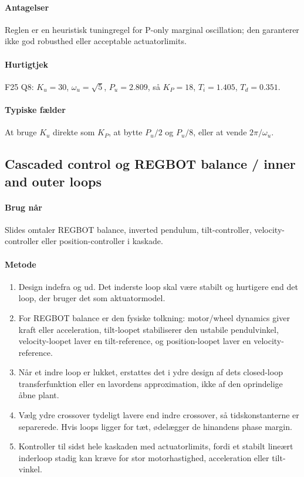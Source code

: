 \paragraph{Antagelser}
Reglen er en heuristisk tuningregel for P-only marginal oscillation; den garanterer ikke
god robusthed eller acceptable actuatorlimits.

\paragraph{Hurtigtjek}
F25 Q8: \(K_u=30\), \(\omega_u=\sqrt5\), \(P_u=2.809\), så \(K_P=18\),
\(T_i=1.405\), \(T_d=0.351\).

\paragraph{Typiske fælder}
At bruge \(K_u\) direkte som \(K_P\), at bytte \(P_u/2\) og \(P_u/8\), eller at vende
\(2\pi/\omega_u\).

\subsection{Cascaded control og REGBOT balance / inner and outer loops}
\label{sec:cascade-regbot}

\paragraph{Brug når}
Slides omtaler REGBOT balance, inverted pendulum, tilt-controller, velocity-controller
eller position-controller i kaskade.

\paragraph{Metode}
\begin{enumerate}
\item Design indefra og ud. Det inderste loop skal være stabilt og hurtigere end det
      loop, der bruger det som aktuatormodel.
\item For REGBOT balance er den fysiske tolkning: motor/wheel dynamics giver kraft eller
      acceleration, tilt-loopet stabiliserer den ustabile pendulvinkel, velocity-loopet
      laver en tilt-reference, og position-loopet laver en velocity-reference.
\item Når et indre loop er lukket, erstattes det i ydre design af dets closed-loop
      transferfunktion eller en lavordens approximation, ikke af den oprindelige åbne
      plant.
\item Vælg ydre crossover tydeligt lavere end indre crossover, så tidskonstanterne er
      separerede. Hvis loops ligger for tæt, ødelægger de hinandens phase margin.
\item Kontroller til sidst hele kaskaden med actuatorlimits, fordi et stabilt lineært
      inderloop stadig kan kræve for stor motorhastighed, acceleration eller tilt-vinkel.
\end{enumerate}

